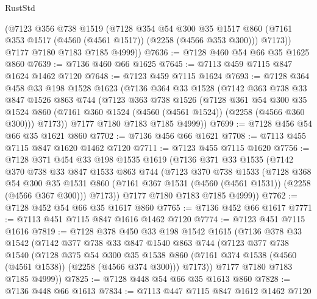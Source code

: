 \begin{lexlean}{RustStd}
\begin{coremodule}
        (@7123
          @356
          @738
          @1519
          (@7128
            @354
            @54
            @300
            @35
            @1517
            @860
            (@7161 @353 @1517 (@4560 (@4561 @1517)) (@2258 (@4566 @353 @300)))
            @7173))
        @7177
        @7180
        @7183
        @7185
        @4999))
@7636 := @7128 @460 @54 @66 @35 @1625 @860
@7639 := @7136 @460 @66 @1625
@7645 := @7113 @459 @7115 @847 @1624 @1462 @7120
@7648 := @7123 @459 @7115 @1624
@7693 := @7128
    @364
    @458
    @33
    @198
    @1528
    @1623
    (@7136
      @364
      @33
      @1528
      (@7142
        @363
        @738
        @33
        @847
        @1526
        @863
        @744
        (@7123
          @363
          @738
          @1526
          (@7128
            @361
            @54
            @300
            @35
            @1524
            @860
            (@7161 @360 @1524 (@4560 (@4561 @1524)) (@2258 (@4566 @360 @300)))
            @7173))
        @7177
        @7180
        @7183
        @7185
        @4999))
@7699 := @7128 @456 @54 @66 @35 @1621 @860
@7702 := @7136 @456 @66 @1621
@7708 := @7113 @455 @7115 @847 @1620 @1462 @7120
@7711 := @7123 @455 @7115 @1620
@7756 := @7128
    @371
    @454
    @33
    @198
    @1535
    @1619
    (@7136
      @371
      @33
      @1535
      (@7142
        @370
        @738
        @33
        @847
        @1533
        @863
        @744
        (@7123
          @370
          @738
          @1533
          (@7128
            @368
            @54
            @300
            @35
            @1531
            @860
            (@7161 @367 @1531 (@4560 (@4561 @1531)) (@2258 (@4566 @367 @300)))
            @7173))
        @7177
        @7180
        @7183
        @7185
        @4999))
@7762 := @7128 @452 @54 @66 @35 @1617 @860
@7765 := @7136 @452 @66 @1617
@7771 := @7113 @451 @7115 @847 @1616 @1462 @7120
@7774 := @7123 @451 @7115 @1616
@7819 := @7128
    @378
    @450
    @33
    @198
    @1542
    @1615
    (@7136
      @378
      @33
      @1542
      (@7142
        @377
        @738
        @33
        @847
        @1540
        @863
        @744
        (@7123
          @377
          @738
          @1540
          (@7128
            @375
            @54
            @300
            @35
            @1538
            @860
            (@7161 @374 @1538 (@4560 (@4561 @1538)) (@2258 (@4566 @374 @300)))
            @7173))
        @7177
        @7180
        @7183
        @7185
        @4999))
@7825 := @7128 @448 @54 @66 @35 @1613 @860
@7828 := @7136 @448 @66 @1613
@7834 := @7113 @447 @7115 @847 @1612 @1462 @7120

\end{coremodule}
\end{lexlean}
